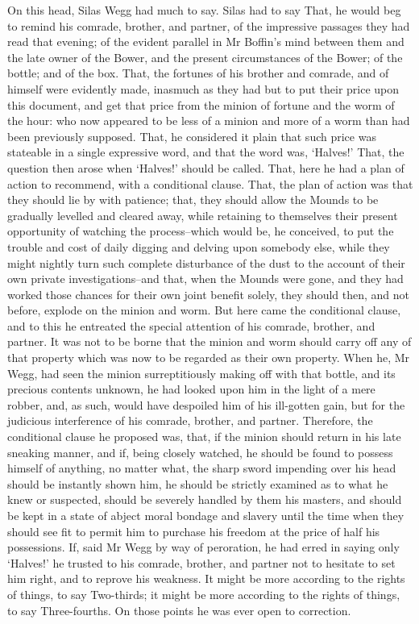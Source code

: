 On this head, Silas Wegg had much to say. Silas had to say That, he
would beg to remind his comrade, brother, and partner, of the impressive
passages they had read that evening; of the evident parallel in Mr
Boffin’s mind between them and the late owner of the Bower, and the
present circumstances of the Bower; of the bottle; and of the box. That,
the fortunes of his brother and comrade, and of himself were evidently
made, inasmuch as they had but to put their price upon this document,
and get that price from the minion of fortune and the worm of the hour:
who now appeared to be less of a minion and more of a worm than had been
previously supposed. That, he considered it plain that such price was
stateable in a single expressive word, and that the word was, ‘Halves!’
That, the question then arose when ‘Halves!’ should be called. That,
here he had a plan of action to recommend, with a conditional clause.
That, the plan of action was that they should lie by with patience;
that, they should allow the Mounds to be gradually levelled and cleared
away, while retaining to themselves their present opportunity of
watching the process--which would be, he conceived, to put the trouble
and cost of daily digging and delving upon somebody else, while they
might nightly turn such complete disturbance of the dust to the account
of their own private investigations--and that, when the Mounds were
gone, and they had worked those chances for their own joint benefit
solely, they should then, and not before, explode on the minion and
worm. But here came the conditional clause, and to this he entreated the
special attention of his comrade, brother, and partner. It was not to
be borne that the minion and worm should carry off any of that property
which was now to be regarded as their own property. When he, Mr Wegg,
had seen the minion surreptitiously making off with that bottle, and its
precious contents unknown, he had looked upon him in the light of a mere
robber, and, as such, would have despoiled him of his ill-gotten gain,
but for the judicious interference of his comrade, brother, and partner.
Therefore, the conditional clause he proposed was, that, if the minion
should return in his late sneaking manner, and if, being closely
watched, he should be found to possess himself of anything, no matter
what, the sharp sword impending over his head should be instantly shown
him, he should be strictly examined as to what he knew or suspected,
should be severely handled by them his masters, and should be kept in
a state of abject moral bondage and slavery until the time when they
should see fit to permit him to purchase his freedom at the price of
half his possessions. If, said Mr Wegg by way of peroration, he had
erred in saying only ‘Halves!’ he trusted to his comrade, brother, and
partner not to hesitate to set him right, and to reprove his weakness.
It might be more according to the rights of things, to say
Two-thirds; it might be more according to the rights of things, to say
Three-fourths. On those points he was ever open to correction.

